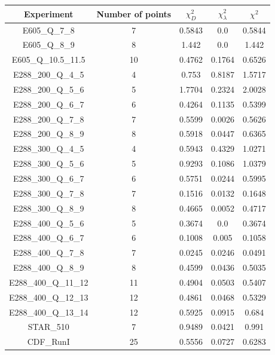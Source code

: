 \documentclass[
]{article}
\begin{document}
\begin{table}[h]

\centering

\begin{tabular}{|c|c|c|c|c|} \hline

\textbf{Experiment} & \textbf{Number of
points} & \textbf{\(\chi_{D}^2\)} & \textbf{\(\chi_{\lambda}^2\)} & \textbf{\(\chi^2\)} \\ \hline

E605\_Q\_7\_8 & 7 & 0.5843 & 0.0 & 0.5844 \\ \hline
E605\_Q\_8\_9 & 8 & 1.442 & 0.0 & 1.442 \\ \hline
E605\_Q\_10.5\_11.5 & 10 & 0.4762 & 0.1764 & 0.6526 \\ \hline
E288\_200\_Q\_4\_5 & 4 & 0.753 & 0.8187 & 1.5717 \\ \hline
E288\_200\_Q\_5\_6 & 5 & 1.7704 & 0.2324 & 2.0028 \\ \hline
E288\_200\_Q\_6\_7 & 6 & 0.4264 & 0.1135 & 0.5399 \\ \hline
E288\_200\_Q\_7\_8 & 7 & 0.5599 & 0.0026 & 0.5626 \\ \hline
E288\_200\_Q\_8\_9 & 8 & 0.5918 & 0.0447 & 0.6365 \\ \hline
E288\_300\_Q\_4\_5 & 4 & 0.5943 & 0.4329 & 1.0271 \\ \hline
E288\_300\_Q\_5\_6 & 5 & 0.9293 & 0.1086 & 1.0379 \\ \hline
E288\_300\_Q\_6\_7 & 6 & 0.5751 & 0.0244 & 0.5995 \\ \hline
E288\_300\_Q\_7\_8 & 7 & 0.1516 & 0.0132 & 0.1648 \\ \hline
E288\_300\_Q\_8\_9 & 8 & 0.4665 & 0.0052 & 0.4717 \\ \hline
E288\_400\_Q\_5\_6 & 5 & 0.3674 & 0.0 & 0.3674 \\ \hline
E288\_400\_Q\_6\_7 & 6 & 0.1008 & 0.005 & 0.1058 \\ \hline
E288\_400\_Q\_7\_8 & 7 & 0.0245 & 0.0246 & 0.0491 \\ \hline
E288\_400\_Q\_8\_9 & 8 & 0.4599 & 0.0436 & 0.5035 \\ \hline
E288\_400\_Q\_11\_12 & 11 & 0.4904 & 0.0503 & 0.5407 \\ \hline
E288\_400\_Q\_12\_13 & 12 & 0.4861 & 0.0468 & 0.5329 \\ \hline
E288\_400\_Q\_13\_14 & 12 & 0.5925 & 0.0915 & 0.684 \\ \hline
STAR\_510 & 7 & 0.9489 & 0.0421 & 0.991 \\ \hline
CDF\_RunI & 25 & 0.5556 & 0.0727 & 0.6283 \\ \hline

\end{tabular}
\end{table}
\end{document}
